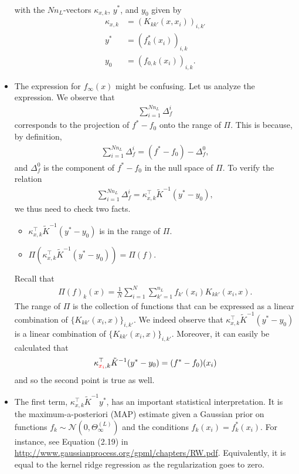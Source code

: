 \documentclass[10pt]{article}
\newcommand{\NN}{\mathcal{N}}
\newcommand{\paran}[1]{{( #1 )}}
\begin{document}
\begin{itemize}
\begin{align*}
\end{align*}
with the $Nn_L$-vectors $\kappa_{x,k}$, $y^*$, and $y_0$ given by
\begin{align*}
\kappa_{x,k} &= (K_{kk'}(x,x_i))_{i,k'} \\
y^* &= (f^*_k(x_i))_{i,k} \\
y_0 &= (f_{0,k}(x_i))_{i,k}.
\end{align*}
\item The expression for $f_\infty(x)$ might be confusing. Let us analyze the expression. We observe that
\begin{align*}
\sum_{i = 1}^{Nn_L} \Delta^i_f
\end{align*}
corresponds to the projection of $f^* - f_0$ onto the range of $\Pi$. This is because, by definition,
\begin{align*}
\sum_{i = 1}^{Nn_L} \Delta^i_f = (f^* - f_0) - \Delta^0_f,
\end{align*}
and $\Delta^0_f$ is the component of $f^* - f_0$ in the null space of $\Pi$. To verify the relation
\begin{align*}
\sum_{i = 1}^{Nn_L} \Delta^i_f = \kappa^\top_{x,k} \tilde{K}^{-1} (y^* - y_0),
\end{align*}
we thus need to check two facts.
\begin{itemize}
\item $\kappa^\top_{x,k} \tilde{K}^{-1} (y^* - y_0)$ is in the range of $\Pi$.
\item $\Pi(\kappa^\top_{x,k} \tilde{K}^{-1} (y^* - y_0)) = \Pi(f)$.
\end{itemize}
Recall that
\begin{align*}
\Pi(f)_k(x) = \frac{1}{N} \sum_{i = 1}^N \sum_{k' = 1}^{n_L} f_{k'}(x_i) K_{kk'}(x_i,x).
\end{align*}
The range of $\Pi$ is the collection of functions that can be expressed as a linear combination of $\{K_{kk'}(x_i,x)\}_{i,k'}$. We indeed observe that $\kappa^\top_{x,k} \tilde{K}^{-1} (y^* - y_0)$ is a linear combination of $\{K_{kk'}(x_i,x)\}_{i,k'}$. Moreover, it can easily be calculated that
\begin{align*}
\kappa^\top_{\textcolor{red}{x_i},k} \tilde{K}^{-1} (y^* - y_0) = (f^* - f_0)(x_i)
\end{align*}
and so the second point is true as well.
\item The first term, $\kappa^\top_{x,k} \tilde{K}^{-1} y^*$, has an important statistical interpretation. It is the maximum-a-posteriori (MAP) estimate given a Gaussian prior on functions $f_k \sim \NN(0,\Theta^\paran{L}_\infty)$ and the conditions $f_k(x_i) = f^*_k(x_i)$. For instance, see Equation (2.19) in \url{http://www.gaussianprocess.org/gpml/chapters/RW.pdf}. Equivalently, it is equal to the kernel ridge regression as the regularization goes to zero.

\end{itemize}
\end{document}
